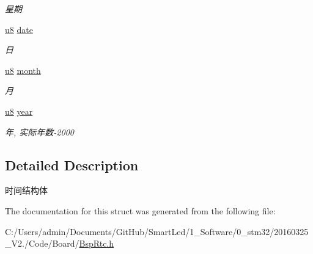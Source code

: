 \begin{DoxyCompactItemize}
\begin{DoxyCompactList}\small\item\em 星期 \end{DoxyCompactList}\item 
\hypertarget{struct_s_t_r___time_a7a5ab064b06221793054847c0e35af4d}{\hyperlink{group___b_s_p_gaed742c436da53c1080638ce6ef7d13de}{u8} \hyperlink{struct_s_t_r___time_a7a5ab064b06221793054847c0e35af4d}{date}}\label{struct_s_t_r___time_a7a5ab064b06221793054847c0e35af4d}

\begin{DoxyCompactList}\small\item\em 日 \end{DoxyCompactList}\item 
\hypertarget{struct_s_t_r___time_ad5f8cd6773aef677b920ae4e4265bb10}{\hyperlink{group___b_s_p_gaed742c436da53c1080638ce6ef7d13de}{u8} \hyperlink{struct_s_t_r___time_ad5f8cd6773aef677b920ae4e4265bb10}{month}}\label{struct_s_t_r___time_ad5f8cd6773aef677b920ae4e4265bb10}

\begin{DoxyCompactList}\small\item\em 月 \end{DoxyCompactList}\item 
\hypertarget{struct_s_t_r___time_ab02bacda75d48acac498f0c9f4e9b1cf}{\hyperlink{group___b_s_p_gaed742c436da53c1080638ce6ef7d13de}{u8} \hyperlink{struct_s_t_r___time_ab02bacda75d48acac498f0c9f4e9b1cf}{year}}\label{struct_s_t_r___time_ab02bacda75d48acac498f0c9f4e9b1cf}

\begin{DoxyCompactList}\small\item\em 年, 实际年数-\/2000 \end{DoxyCompactList}\end{DoxyCompactItemize}


\subsection{\-Detailed \-Description}
时间结构体 

\-The documentation for this struct was generated from the following file\-:\begin{DoxyCompactItemize}
\item 
\-C\-:/\-Users/admin/\-Documents/\-Git\-Hub/\-Smart\-Led/1\-\_\-\-Software/0\-\_\-stm32/20160325\-\_\-\-V2./\-Code/\-Board/\hyperlink{_bsp_rtc_8h}{\-Bsp\-Rtc.\-h}\end{DoxyCompactItemize}
